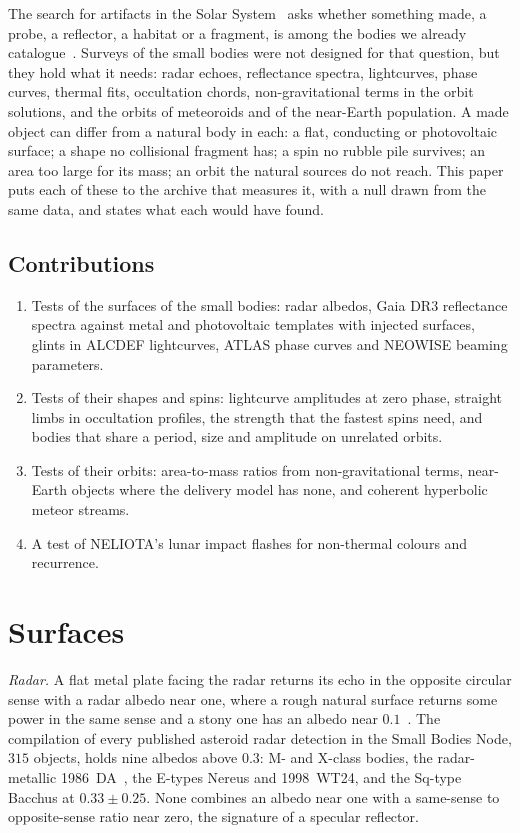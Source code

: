 \documentclass[3p,11pt]{elsarticle}
\begin{document}
The search for artifacts in the Solar System~\cite{Freitas1983,HaqqMisra2012} asks
whether something made, a probe, a reflector, a habitat or a fragment, is among the
bodies we already catalogue~\cite{Benford2019}. Surveys of the small bodies were not
designed for that question, but they hold what it needs: radar echoes, reflectance
spectra, lightcurves, phase curves, thermal fits, occultation chords, non-gravitational
terms in the orbit solutions, and the orbits of meteoroids and of the near-Earth
population. A made object can differ from a natural body in each: a flat, conducting or
photovoltaic surface; a shape no collisional fragment has; a spin no rubble pile
survives; an area too large for its mass; an orbit the natural sources do not reach.
This paper puts each of these to the archive that measures it, with a null drawn from
the same data, and states what each would have found.

\subsection{Contributions}
\begin{enumerate}[leftmargin=*,itemsep=1pt]
\item Tests of the surfaces of the small bodies: radar albedos, Gaia DR3 reflectance
spectra against metal and photovoltaic templates with injected surfaces, glints in
ALCDEF lightcurves, ATLAS phase curves and NEOWISE beaming parameters.
\item Tests of their shapes and spins: lightcurve amplitudes at zero phase, straight
limbs in occultation profiles, the strength that the fastest spins need, and bodies that
share a period, size and amplitude on unrelated orbits.
\item Tests of their orbits: area-to-mass ratios from non-gravitational terms, near-Earth
objects where the delivery model has none, and coherent hyperbolic meteor streams.
\item A test of NELIOTA's lunar impact flashes for non-thermal colours and recurrence.
\end{enumerate}

\section{Surfaces}\label{sec:surfaces}

\emph{Radar.} A flat metal plate facing the radar returns its echo in the opposite
circular sense with a radar albedo near one, where a rough natural surface returns some
power in the same sense and a stony one has an albedo near $0.1$~\cite{Shepard2015}. The
compilation of every published asteroid radar detection in the Small Bodies Node, $315$
objects, holds nine albedos above $0.3$: M- and X-class bodies, the radar-metallic
1986~DA~\cite{Ostro1991}, the E-types Nereus and 1998~WT24, and the Sq-type Bacchus at
$0.33\pm0.25$. None combines an albedo near one with a same-sense to opposite-sense ratio
near zero, the signature of a specular reflector.
\end{document}
